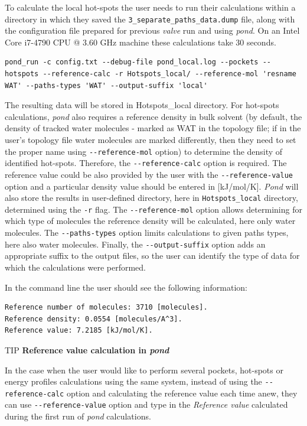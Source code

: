 \documentclass[9pt,tutorial, pubversion]{livecoms}
\begin{document}
To calculate the local hot-spots the user needs to run their calculations within a directory in which they saved the \texttt{3\_separate\_paths\_data.dump} file, along with the configuration file prepared for previous \emph{valve} run and using \emph{pond}. On an Intel Core i7-4790 CPU @ 3.60 GHz machine these calculations take 30 seconds.
\begin{lstlisting}
pond_run -c config.txt --debug-file pond_local.log --pockets --hotspots --reference-calc -r Hotspots_local/ --reference-mol 'resname WAT' --paths-types 'WAT' --output-suffix 'local'
\end{lstlisting}
The resulting data will be stored in Hotspots\_local directory. For hot-spots calculations, \emph{pond} also requires a reference density in bulk solvent (by default, the density of tracked water molecules - marked as WAT in the topology file; if in the user's topology file water molecules are marked differently, then they need to set the proper name using \texttt{-{}-reference-mol} option) to determine the density of identified hot-spots. Therefore, the \texttt{-{}-reference-calc} option is required. The reference value could be also provided by the user with the \texttt{-{}-reference-value} option and a particular density value should be entered in [kJ/mol/K].
\emph{Pond} will also store the results in user-defined directory, here in \texttt{Hotspots\_local} directory, determined using the \texttt{-r} flag. The \texttt{-{}-reference-mol} option allows determining for which type of molecules the reference density will be calculated, here only water molecules. The \texttt{-{}-paths-types} option limits calculations to given paths types, here also water molecules. Finally, the \texttt{-{}-output-suffix} option adds an appropriate suffix to the output files, so the user can identify the type of data for which the calculations were performed. 

In the command line the user should see the following information:
\begin{lstlisting}[columns=fullflexible]
Reference number of molecules: 3710 [molecules].
Reference density: 0.0554 [molecules/A^3].
Reference value: 7.2185 [kJ/mol/K].
\end{lstlisting}

\begin{Checklists}
\begin{checklist}{TIP}
\textbf{Reference value calculation in \textit{pond}}

In the case when the user would like to perform several pockets, hot-spots or energy profiles calculations using the same system, instead of using the \texttt{-{}-reference-calc} option and calculating the reference value each time anew, they can use \texttt{-{}-reference-value} option and type in the \textit{Reference value} calculated during the first run of \textit{pond} calculations.
\end{checklist}
\end{Checklists}
\end{document}
